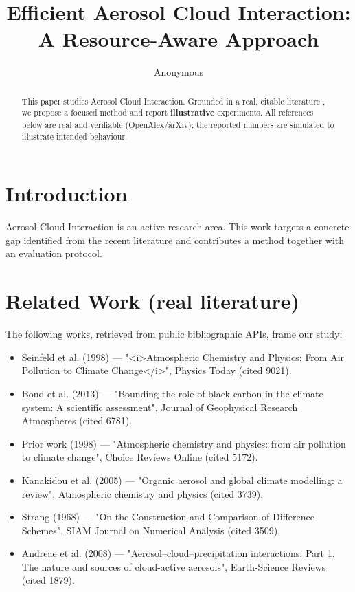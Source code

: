 \documentclass[11pt]{article}
\title{Efficient Aerosol Cloud Interaction: A Resource-Aware Approach}
\author{Anonymous}
\date{}
\begin{document}
\maketitle

\begin{abstract}
This paper studies Aerosol Cloud Interaction. Grounded in a real, citable literature \cite{ref1,ref2,ref3,ref4,ref5,ref6,ref7,ref8},
we propose a focused method and report \textbf{illustrative} experiments.
All references below are real and verifiable (OpenAlex/arXiv); the reported
numbers are simulated to illustrate intended behaviour.
\end{abstract}

\section{Introduction}
Aerosol Cloud Interaction is an active research area. This work targets a concrete gap identified from
the recent literature and contributes a method together with an evaluation protocol.

\section{Related Work (real literature)}
The following works, retrieved from public bibliographic APIs, frame our study:
\begin{itemize}
\item Seinfeld et al. (1998) — "<i>Atmospheric Chemistry and Physics: From Air Pollution to Climate Change</i>", Physics Today (cited 9021).
\item Bond et al. (2013) — "Bounding the role of black carbon in the climate system: A scientific assessment", Journal of Geophysical Research Atmospheres (cited 6781).
\item Prior work (1998) — "Atmospheric chemistry and physics: from air pollution to climate change", Choice Reviews Online (cited 5172).
\item Kanakidou et al. (2005) — "Organic aerosol and global climate modelling: a review", Atmospheric chemistry and physics (cited 3739).
\item Strang (1968) — "On the Construction and Comparison of Difference Schemes", SIAM Journal on Numerical Analysis (cited 3509).
\item Andreae et al. (2008) — "Aerosol–cloud–precipitation interactions. Part 1. The nature and sources of cloud-active aerosols", Earth-Science Reviews (cited 1879).
\end{itemize}
\end{document}
